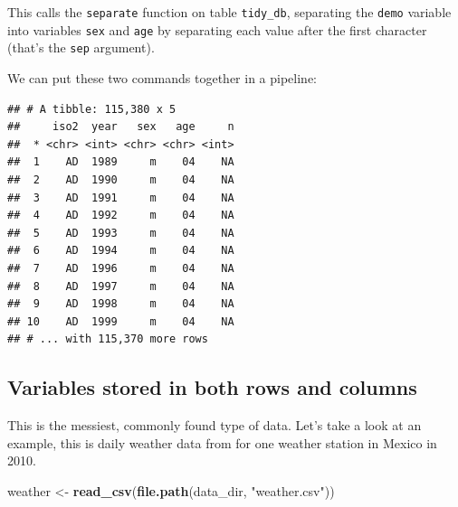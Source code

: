\documentclass[12pt,]{book}
\newenvironment{Shaded}{\begin{snugshade}}{\end{snugshade}}
\newcommand{\KeywordTok}[1]{\textcolor[rgb]{0.13,0.29,0.53}{\textbf{#1}}}
\newcommand{\DataTypeTok}[1]{\textcolor[rgb]{0.13,0.29,0.53}{#1}}
\newcommand{\DecValTok}[1]{\textcolor[rgb]{0.00,0.00,0.81}{#1}}
\newcommand{\StringTok}[1]{\textcolor[rgb]{0.31,0.60,0.02}{#1}}
\newcommand{\OperatorTok}[1]{\textcolor[rgb]{0.81,0.36,0.00}{\textbf{#1}}}
\newcommand{\NormalTok}[1]{#1}
\theoremstyle{definition}
\theoremstyle{definition}
\theoremstyle{remark}
\begin{document}
This calls the \texttt{separate} function on table \texttt{tidy\_db},
separating the \texttt{demo} variable into variables \texttt{sex} and
\texttt{age} by separating each value after the first character (that's
the \texttt{sep} argument).

We can put these two commands together in a pipeline:

\begin{Shaded}
\end{Shaded}

\begin{verbatim}
## # A tibble: 115,380 x 5
##     iso2  year   sex   age     n
##  * <chr> <int> <chr> <chr> <int>
##  1    AD  1989     m    04    NA
##  2    AD  1990     m    04    NA
##  3    AD  1991     m    04    NA
##  4    AD  1992     m    04    NA
##  5    AD  1993     m    04    NA
##  6    AD  1994     m    04    NA
##  7    AD  1996     m    04    NA
##  8    AD  1997     m    04    NA
##  9    AD  1998     m    04    NA
## 10    AD  1999     m    04    NA
## # ... with 115,370 more rows
\end{verbatim}

\subsection{Variables stored in both rows and
columns}\label{variables-stored-in-both-rows-and-columns}

This is the messiest, commonly found type of data. Let's take a look at
an example, this is daily weather data from for one weather station in
Mexico in 2010.

\begin{Shaded}
\begin{Highlighting}[]
\NormalTok{weather <-}\StringTok{ }\KeywordTok{read_csv}\NormalTok{(}\KeywordTok{file.path}\NormalTok{(data_dir, }\StringTok{"weather.csv"}\NormalTok{))}
\end{Highlighting}
\end{Shaded}
\end{document}
